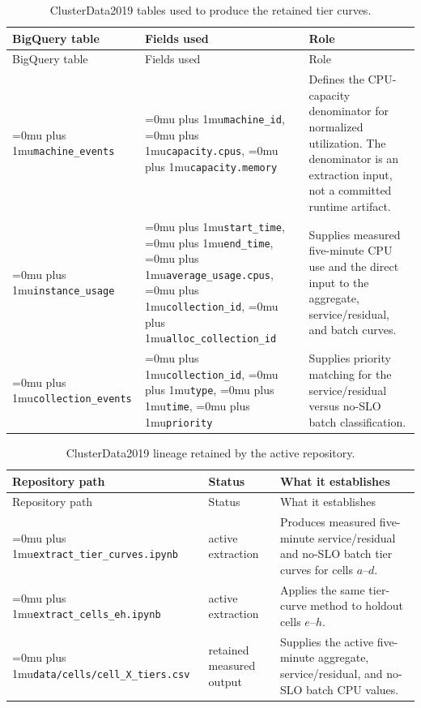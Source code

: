 \documentclass[12pt]{article}
\newcommand{\codepath}[1]{{\Urlmuskip=0mu plus 1mu\relax\nolinkurl{#1}}}
\begin{document}
\begin{longtable}{@{}L{0.20\textwidth}L{0.32\textwidth}L{0.40\textwidth}@{}}
  \caption{ClusterData2019 tables used to produce the retained tier curves.}
  \label{tab:clusterdata-upstream-fields}\\
  \toprule
  BigQuery table & Fields used & Role \\
  \midrule
  \endfirsthead
  \toprule
  BigQuery table & Fields used & Role \\
  \midrule
  \endhead
  \codepath{machine_events}
    & \codepath{machine_id}, \codepath{capacity.cpus},
      \codepath{capacity.memory}
    & Defines the CPU-capacity denominator for normalized utilization. The
      denominator is an extraction input, not a committed runtime artifact. \\
  \codepath{instance_usage}
    & \codepath{start_time}, \codepath{end_time},
      \codepath{average_usage.cpus}, \codepath{collection_id},
      \codepath{alloc_collection_id}
    & Supplies measured five-minute CPU use and the direct input to the
      aggregate, service/residual, and batch curves. \\
  \codepath{collection_events}
    & \codepath{collection_id}, \codepath{type}, \codepath{time},
      \codepath{priority}
    & Supplies priority matching for the service/residual versus no-SLO batch
      classification. \\
  \bottomrule
\end{longtable}

\begin{longtable}{@{}L{0.34\textwidth}L{0.19\textwidth}L{0.39\textwidth}@{}}
  \caption{ClusterData2019 lineage retained by the active repository.}
  \label{tab:clusterdata-artifact-lineage}\\
  \toprule
  Repository path & Status & What it establishes \\
  \midrule
  \endfirsthead
  \toprule
  Repository path & Status & What it establishes \\
  \midrule
  \endhead
  \codepath{extract_tier_curves.ipynb}
    & active extraction
    & Produces measured five-minute service/residual and no-SLO batch tier curves
      for cells \(a\)--\(d\). \\
  \codepath{extract_cells_eh.ipynb}
    & active extraction
    & Applies the same tier-curve method to holdout cells \(e\)--\(h\). \\
  \codepath{data/cells/cell_X_tiers.csv}
    & retained measured output
    & Supplies the active five-minute aggregate, service/residual, and no-SLO
      batch CPU values. \\
  \bottomrule
\end{longtable}
\end{document}
